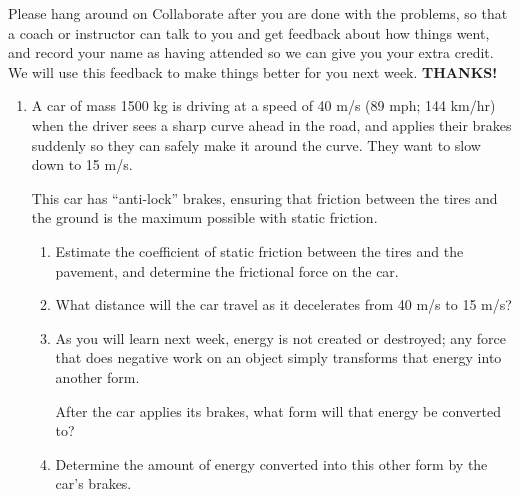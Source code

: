 \documentclass[12pt]{article}
\begin{document}
\Large
\centerline{}
\normalsize
\centerline{}

\bigskip

\it \begin{center} \footnotesize Please hang around on Collaborate after you are done with the problems, so that a coach or instructor can talk to you and get feedback about how things went, and record your name as having attended so we can give you your extra credit. We will use this feedback to make things better for you next week. \bf THANKS! \end{center}
\rm 
{}
\begin{enumerate}

  \item{A car of mass 1500 kg is driving at a speed of 40 m/s (89 mph; 144 km/hr) when the driver sees a sharp curve ahead in the road, and applies their brakes suddenly so they can safely
make it around the curve. They want to slow down to 15 m/s.

This car has ``anti-lock'' brakes, ensuring that friction between
the tires and the ground is the maximum possible with static friction.} 

\begin{enumerate}
\item Estimate the coefficient of static friction between the tires and the pavement, and determine the frictional force on the car.

\vspace{3in}

\item What distance will the car travel as it decelerates from 40 m/s to 15 m/s?
\vspace{3in}
\item As you will learn next week, energy is not created or destroyed; any force that does negative work on an object simply transforms that energy into another form. 



After the car applies its brakes, what form will that energy be converted to? 
\vspace{2in}

\item Determine the amount of energy converted into this other form by the car's brakes.

\vspace{4in}
\newpage
\end{enumerate} 


\end{enumerate}
\end{document}
